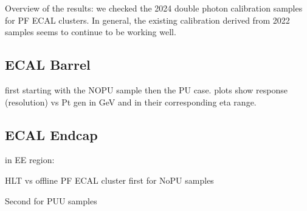 Overview of the results: we checked the 2024 double photon calibration samples for PF ECAL clusters. In general, the existing calibration derived from 2022 samples seems to continue to be working well. 

 
\subsection{ECAL Barrel}
first starting with the NOPU sample then the PU case.
plots show response (resolution) vs Pt gen in GeV and in their corresponding eta range.





\subsection{ECAL Endcap}
in EE region:







HLT vs offline PF ECAL cluster
first for NoPU samples

Second for PUU samples

